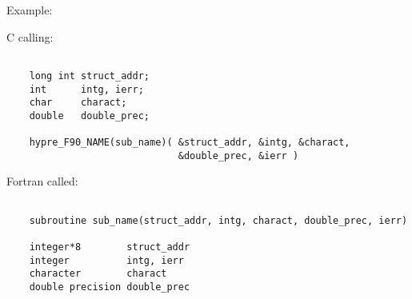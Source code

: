 \noindent Example:

\vspace{0.1in}

  C calling:
\begin{verbatim}

    long int struct_addr;
    int      intg, ierr;
    char     charact;
    double   double_prec;

    hypre_F90_NAME(sub_name)( &struct_addr, &intg, &charact,
                              &double_prec, &ierr )

\end{verbatim}

  Fortran called:
\begin{verbatim}

    subroutine sub_name(struct_addr, intg, charact, double_prec, ierr)

    integer*8        struct_addr
    integer          intg, ierr
    character        charact
    double precision double_prec

\end{verbatim}

